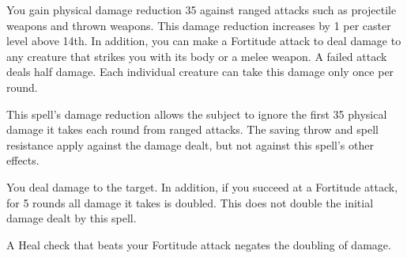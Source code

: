 \spelldur{\durshort \dismissable}
\begin{spelleffect}
    You gain physical damage reduction 35 against ranged attacks such as projectile weapons and thrown weapons. This damage reduction increases by 1 per caster level above 14th. In addition, you can make a Fortitude attack to deal damage to any creature that strikes you with its body or a melee weapon. A failed attack deals half damage. Each individual creature can take this damage only once per round.
\end{spelleffect}
\begin{spellnotes}
    This spell's damage reduction allows the subject to ignore the first 35 physical damage it takes each round from ranged attacks. The saving throw and spell resistance apply against the damage dealt, but not against this spell's other effects.
\end{spellnotes}

\begin{spelleffect}
    You deal damage to the target. In addition, if you succeed at a Fortitude attack, for 5 rounds all damage it takes is doubled. This does not double the initial damage dealt by this spell.
\end{spelleffect}
\begin{spellnotes}
    A Heal check that beats your Fortitude attack negates the doubling of damage. 
\end{spellnotes}

